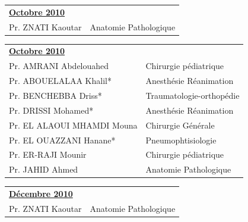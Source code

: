 \begin{table}[H]
  \begin{tabular}{l l}
    \multicolumn{2}{l}{\textbf{\underline{Octobre 2010}}}\vspace*{0.5em}\\

    Pr. ZNATI Kaoutar & \hspace*{8em} Anatomie Pathologique\\ 

  \end{tabular}
\end{table}


\begin{table}[H]
  \begin{tabular}{l l}
    \multicolumn{2}{l}{\textbf{\underline{Octobre 2010}}}\vspace*{0.5em}\\

    Pr. AMRANI Abdelouahed & \hspace*{2em} Chirurgie pédiatrique\\ 
    Pr. ABOUELALAA Khalil* & \hspace*{2em} Anesthésie Réanimation\\       
    Pr. BENCHEBBA Driss* & \hspace*{2em} Traumatologie-orthopédie\\
    Pr. DRISSI Mohamed* & \hspace*{2em} Anesthésie Réanimation\\
    Pr. EL ALAOUI MHAMDI Mouna & \hspace*{2em} Chirurgie Générale\\       
    Pr. EL OUAZZANI Hanane* & \hspace*{2em} Pneumophtisiologie\\
    Pr. ER-RAJI Mounir & \hspace*{2em} Chirurgie pédiatrique\\
    Pr. JAHID Ahmed & \hspace*{2em} Anatomie Pathologique\\

  \end{tabular}
\end{table}


\begin{table}[H]
  \begin{tabular}{l l}
    \multicolumn{2}{l}{\textbf{\underline{Décembre 2010}}}\vspace*{0.5em}\\

    Pr. ZNATI Kaoutar & \hspace*{2em} Anatomie Pathologique \\       

  \end{tabular}
\end{table}

